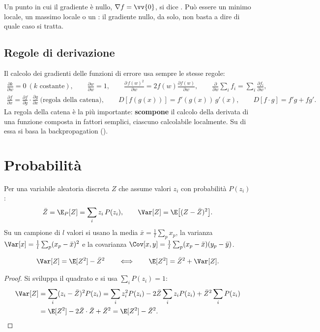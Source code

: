 \begin{definizione}
Un punto in cui il gradiente è nullo, $\nabla f = \vv{0}$, si dice . Può essere un
minimo locale, un massimo locale o un : il gradiente nullo, da solo, non basta a dire di
quale caso si tratta.
\end{definizione}

\subsection{Regole di derivazione}
\label{sec:regole-derivazione}

Il calcolo dei gradienti delle funzioni di errore usa sempre le stesse regole:
\begin{gather}
\frac{\partial k}{\partial w} = 0 \ (k \text{ costante}), \qquad \frac{\partial w}{\partial w} = 1, \qquad
\frac{\partial\, f(w)^2}{\partial w} = 2f(w)\frac{\partial f(w)}{\partial w}, \qquad
\frac{\partial}{\partial w}\sum_i f_i = \sum_i\frac{\partial f_i}{\partial w}, \\
\frac{\partial f}{\partial x} = \frac{\partial f}{\partial g}\cdot\frac{\partial g}{\partial x}
\ \text{(regola della catena)}, \qquad D[f(g(x))] = f'(g(x))\,g'(x), \qquad D[f\cdot g] = f'g + fg' .
\label{eq:catena}
\end{gather}
La regola della catena è la più importante: \textbf{scompone} il calcolo della derivata di una funzione composta
in fattori semplici, ciascuno calcolabile localmente. Su di essa si basa la backpropagation
().

\section{Probabilità}
\label{sec:probabilita}

\begin{definizione}
Per una variabile aleatoria discreta $Z$ che assume valori $z_i$ con probabilità $P(z_i)$:
\[
\bar Z = \E_P[Z] = \sum_i z_i\,P(z_i), \qquad \Var[Z] = \E\big[(Z-\bar Z)^2\big].
\]
Su un campione di $l$ valori si usano la media $\bar x = \frac1l\sum_p x_p$, la varianza
$\Var[x] = \frac1l\sum_p (x_p-\bar x)^2$ e la covarianza $\Cov[x,y] = \frac1l\sum_p (x_p-\bar x)(y_p-\bar y)$.
\end{definizione}

\begin{teorema}
\[
\Var[Z] = \E[Z^2] - \bar Z^2 \qquad\Longleftrightarrow\qquad \E[Z^2] = \bar Z^2 + \Var[Z].
\]
\end{teorema}
\begin{proof}
Si sviluppa il quadrato e si usa $\sum_i P(z_i) = 1$:
\begin{align*}
\Var[Z] &= \sum_i (z_i-\bar Z)^2P(z_i) = \sum_i z_i^2P(z_i) - 2\bar Z\sum_i z_iP(z_i) + \bar Z^2\sum_iP(z_i)\\
&= \E[Z^2] - 2\bar Z\cdot\bar Z + \bar Z^2 = \E[Z^2]-\bar Z^2. \qedhere
\end{align*}
\end{proof}

